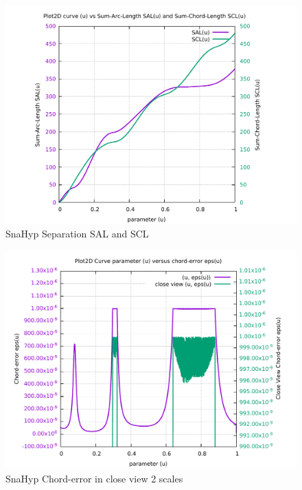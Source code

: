 \begin{figure}
	\caption     {SnaHyp Separation SAL and SCL}
	\label{08-img-SnaHyp-Separation-SAL-and-SCL.pdf}
\includegraphics[width=1.00\textwidth]{Chap4/appendix/app-SnaHyp/plots/08-img-SnaHyp-Separation-SAL-and-SCL.pdf}
\end{figure}

\clearpage
\pagebreak

\begin{figure}
	\caption     {SnaHyp Chord-error in close view 2 scales}
	\label{09-img-SnaHyp-Chord-error-in-close-view-2-scales.pdf}
\includegraphics[width=1.00\textwidth]{Chap4/appendix/app-SnaHyp/plots/09-img-SnaHyp-Chord-error-in-close-view-2-scales.pdf}
\end{figure}

